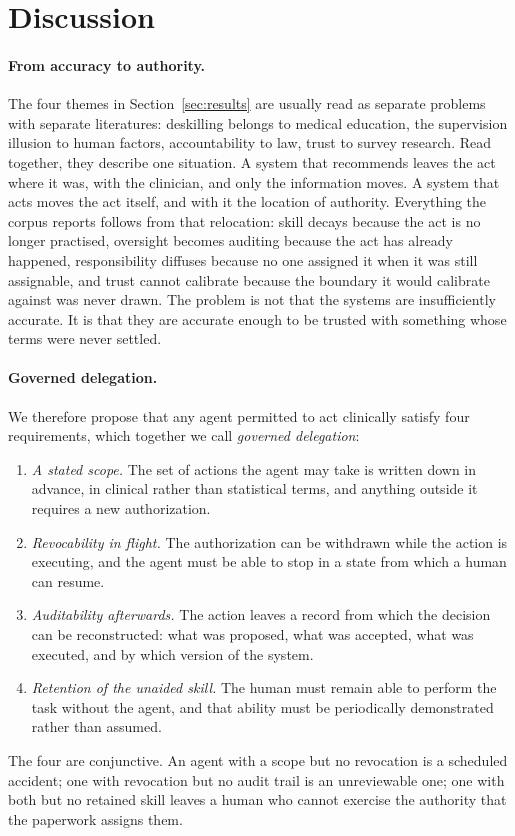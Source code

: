 \section{Discussion}
\label{sec:discussion}

\paragraph{From accuracy to authority.}
The four themes in Section~\ref{sec:results} are usually read as separate problems with separate literatures: deskilling belongs to medical education, the supervision illusion to human factors, accountability to law, trust to survey research. Read together, they describe one situation. A system that recommends leaves the act where it was, with the clinician, and only the information moves. A system that acts moves the act itself, and with it the location of authority. Everything the corpus reports follows from that relocation: skill decays because the act is no longer practised, oversight becomes auditing because the act has already happened, responsibility diffuses because no one assigned it when it was still assignable, and trust cannot calibrate because the boundary it would calibrate against was never drawn. The problem is not that the systems are insufficiently accurate. It is that they are accurate enough to be trusted with something whose terms were never settled.

\paragraph{Governed delegation.}
We therefore propose that any agent permitted to act clinically satisfy four requirements, which together we call \emph{governed delegation}:
\begin{enumerate}
  \item \emph{A stated scope.} The set of actions the agent may take is written down in advance, in clinical rather than statistical terms, and anything outside it requires a new authorization.
  \item \emph{Revocability in flight.} The authorization can be withdrawn while the action is executing, and the agent must be able to stop in a state from which a human can resume.
  \item \emph{Auditability afterwards.} The action leaves a record from which the decision can be reconstructed: what was proposed, what was accepted, what was executed, and by which version of the system.
  \item \emph{Retention of the unaided skill.} The human must remain able to perform the task without the agent, and that ability must be periodically demonstrated rather than assumed.
\end{enumerate}
The four are conjunctive. An agent with a scope but no revocation is a scheduled accident; one with revocation but no audit trail is an unreviewable one; one with both but no retained skill leaves a human who cannot exercise the authority that the paperwork assigns them.

